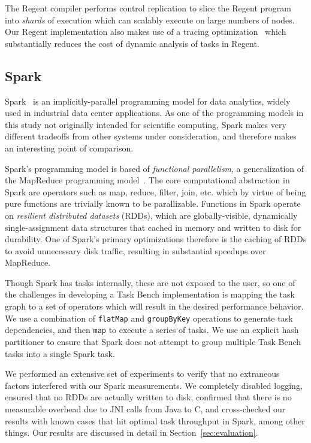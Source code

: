 The Regent compiler performs control replication to slice the Regent
program into \emph{shards} of execution which can scalably execute on
large numbers of nodes. Our Regent implementation also makes use of a
tracing optimization~\cite{LegionTracing18} which substantially
reduces the cost of dynamic analysis of tasks in Regent.

\subsection{Spark}

Spark~\cite{Spark10} is an implicitly-parallel programming model for
data analytics, widely used in industrial data center applications. As
one of the programming models in this study not originally intended
for scientific computing, Spark makes very different tradeoffs from
other systems under consideration, and therefore makes an interesting
point of comparison.

Spark's programming model is based of \emph{functional parallelism}, a
generalization of the MapReduce programming
model~\cite{MapReduce04}. The core computational abstraction in Spark
are operators such as map, reduce, filter, join, etc. which by virtue
of being pure functions are trivially known to be
parallizable. Functions in Spark operate on \emph{resilient
  distributed datasets} (RDDs), which are globally-visible,
dynamically single-assignment data structures that cached in memory
and written to disk for durability. One of Spark's primary
optimizations therefore is the caching of RDDs to avoid unnecessary
disk traffic, resulting in substantial speedups over MapReduce.

Though Spark has tasks internally, these are not exposed to the user,
so one of the challenges in developing a Task Bench implementation is
mapping the task graph to a set of operators which will result in the
desired performance behavior. We use a combination of
\lstinline[language=Scala]{flatMap} and
\lstinline[language=Scala]{groupByKey} operations to generate task
dependencies, and then \lstinline[language=Scala]{map} to execute a
series of tasks. We use an explicit hash partitioner to ensure that
Spark does not attempt to group multiple Task Bench tasks into a
single Spark task.

We performed an extensive set of experiments to verify that no
extraneous factors interfered with our Spark measurements. We
completely disabled logging, ensured that no RDDs are actually written
to disk, confirmed that there is no measurable overhead due to JNI
calls from Java to C, and cross-checked our results with known cases
that hit optimal task throughput in Spark, among other things. Our
results are discussed in detail in Section~\ref{sec:evaluation}.

